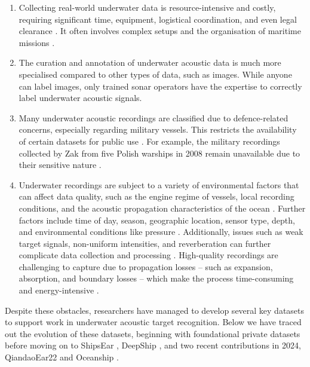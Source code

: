 \begin{enumerate}
    \item Collecting real-world underwater data is resource-intensive and costly, requiring significant time, equipment, logistical coordination, and even legal clearance \cite{irfan_deepship_2021}. It often involves complex setups and the organisation of maritime missions \cite{domingos_survey_2022}.
    \item The curation and annotation of underwater acoustic data is much more specialised compared to other types of data, such as images. While anyone can label images, only trained sonar operators have the expertise to correctly label underwater acoustic signals.
    \item Many underwater acoustic recordings are classified due to defence-related concerns, especially regarding military vessels. This restricts the availability of certain datasets for public use \cite{irfan_deepship_2021, domingos_survey_2022}. For example, the military recordings collected by Zak from five Polish warships in 2008 remain unavailable due to their sensitive nature \cite{zak_ships_2008}.
    \item Underwater recordings are subject to a variety of environmental factors that can affect data quality, such as the engine regime of vessels, local recording conditions, and the acoustic propagation characteristics of the ocean \cite{david_santos-dominguez_shipsear_2016}. Further factors include time of day, season, geographic location, sensor type, depth, and environmental conditions like pressure \cite{domingos_survey_2022, hovem_marine_2012}. Additionally, issues such as weak target signals, non-uniform intensities, and reverberation can further complicate data collection and processing \cite{luo_survey_2023}. High-quality recordings are challenging to capture due to propagation losses -- such as expansion, absorption, and boundary losses -- which make the process time-consuming and energy-intensive \cite{luo_survey_2023}.
\end{enumerate}

Despite these obstacles, researchers have managed to develop several key datasets to support work in underwater acoustic target recognition. Below we have traced out the evolution of these datasets, beginning with foundational private datasets before moving on to ShipsEar \cite{david_santos-dominguez_shipsear_2016}, DeepShip \cite{irfan_deepship_2021}, and two recent contributions in 2024, QiandaoEar22 \cite{du_qiandaoear22_2024} and Oceanship \cite{huang_oceanship_2024}.

